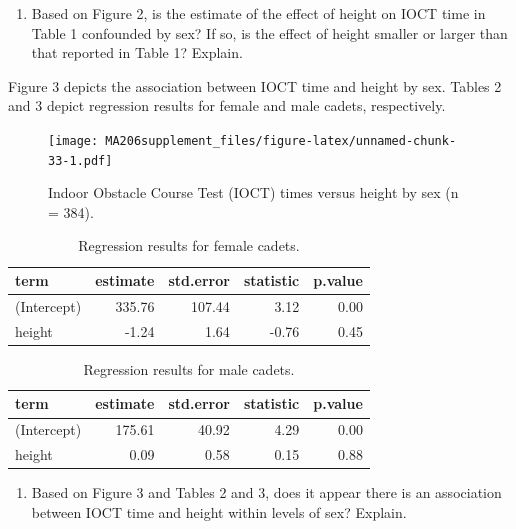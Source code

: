 \documentclass[]{book}
\providecommand{\tightlist}{%
  \setlength{\itemsep}{0pt}\setlength{\parskip}{0pt}}
\begin{document}
\begin{enumerate}
\def\labelenumi{\arabic{enumi}.}
\setcounter{enumi}{12}
\tightlist
\item
  Based on Figure 2, is the estimate of the effect of height on IOCT time in Table 1 confounded by sex? If so, is the effect of height smaller or larger than that reported in Table 1? Explain.
\end{enumerate}

\vspace{1in}

\newpage

Figure 3 depicts the association between IOCT time and height by sex. Tables 2 and 3 depict regression results for female and male cadets, respectively.

\begin{figure}
\centering
\texttt{[image: MA206supplement\_files/figure-latex/unnamed-chunk-33-1.pdf]}
\caption{\label{fig:unnamed-chunk-33}Indoor Obstacle Course Test (IOCT) times versus height by sex (n = 384).}
\end{figure}

\begin{table}

\caption{\label{tab:unnamed-chunk-34}Regression results for female cadets.}
\centering
\begin{tabular}[t]{l|r|r|r|r}
\hline
term & estimate & std.error & statistic & p.value\\
\hline
(Intercept) & 335.76 & 107.44 & 3.12 & 0.00\\
\hline
height & -1.24 & 1.64 & -0.76 & 0.45\\
\hline
\end{tabular}
\end{table}

\begin{table}

\caption{\label{tab:unnamed-chunk-34}Regression results for male cadets.}
\centering
\begin{tabular}[t]{l|r|r|r|r}
\hline
term & estimate & std.error & statistic & p.value\\
\hline
(Intercept) & 175.61 & 40.92 & 4.29 & 0.00\\
\hline
height & 0.09 & 0.58 & 0.15 & 0.88\\
\hline
\end{tabular}
\end{table}

\begin{enumerate}
\def\labelenumi{\arabic{enumi}.}
\setcounter{enumi}{13}
\tightlist
\item
  Based on Figure 3 and Tables 2 and 3, does it appear there is an association between IOCT time and height within levels of sex? Explain.
\end{enumerate}
\end{document}
